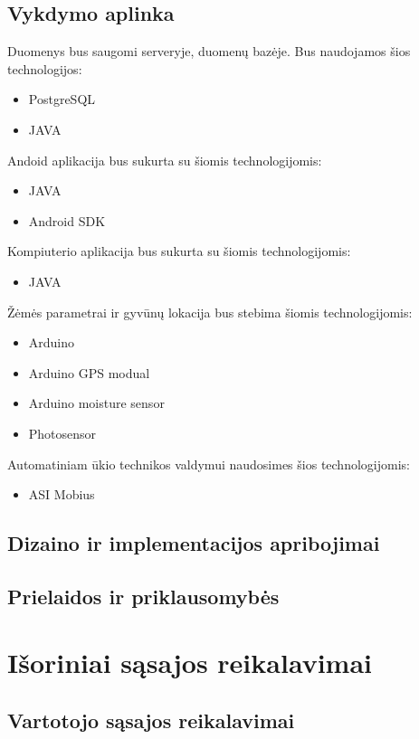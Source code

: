 \documentclass[oneside]{VUMIFPSkursinis}
\begin{document}
\subsection{Vykdymo aplinka}
Duomenys bus saugomi serveryje, duomenų bazėje. Bus naudojamos šios technologijos:
	\begin{itemize}
		\item PostgreSQL
		\item JAVA
	\end{itemize}
Andoid aplikacija bus sukurta su šiomis technologijomis:
	\begin{itemize}
		\item JAVA
		\item Android SDK
	\end{itemize}
Kompiuterio aplikacija bus sukurta su šiomis technologijomis:
	\begin{itemize}
		\item JAVA
	\end{itemize}
Žėmės parametrai ir gyvūnų lokacija bus stebima šiomis technologijomis:
	\begin{itemize}
		\item Arduino
		\item Arduino GPS modual
		\item Arduino moisture sensor
		\item Photosensor
	\end{itemize}
Automatiniam ūkio technikos valdymui naudosimes šios technologijomis:
	\begin{itemize}		
		\item ASI Mobius
	\end{itemize}



\subsection{Dizaino ir implementacijos apribojimai}
\subsection{Prielaidos ir priklausomybės}

\section{Išoriniai sąsajos reikalavimai}
\subsection{Vartotojo sąsajos reikalavimai}
\end{document}
